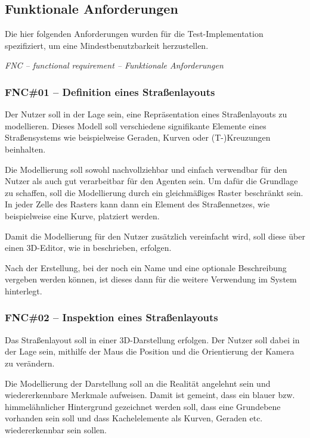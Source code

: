 \subsection{Funktionale Anforderungen}

Die hier folgenden Anforderungen wurden für die Test-Implementation spezifiziert, um eine Mindestbenutzbarkeit herzustellen.

\textit{FNC – functional requirement – Funktionale Anforderungen}

\subsubsection{FNC\#01 – Definition eines Straßenlayouts} \label{fnc:define_layout}

Der Nutzer soll in der Lage sein, eine Repräsentation eines Straßenlayouts zu modellieren.
Dieses Modell soll verschiedene signifikante Elemente eines Straßensystems wie beispielweise Geraden, Kurven oder (T-)Kreuzungen beinhalten.

Die Modellierung soll sowohl nachvollziehbar und einfach verwendbar für den Nutzer als auch gut verarbeitbar für den Agenten sein.
Um dafür die Grundlage zu schaffen, soll die Modellierung durch ein gleichmäßiges Raster beschränkt sein.
In jeder Zelle des Rasters kann dann ein Element des Straßennetzes, wie beispielweise eine Kurve, platziert werden.

Damit die Modellierung für den Nutzer zusätzlich vereinfacht wird, soll diese über einen 3D-Editor, wie in  beschrieben, erfolgen.

Nach der Erstellung, bei der noch ein Name und eine optionale Beschreibung vergeben werden können, ist dieses dann für die weitere Verwendung im System hinterlegt.

\subsubsection{FNC\#02 – Inspektion eines Straßenlayouts} \label{fnc:inspect_layout}

Das Straßenlayout soll in einer 3D-Darstellung erfolgen.
Der Nutzer soll dabei in der Lage sein, mithilfe der Maus die Position und die Orientierung der Kamera zu verändern.

Die Modellierung der Darstellung soll an die Realität angelehnt sein und wiedererkennbare Merkmale aufweisen.
Damit ist gemeint, dass ein blauer bzw. himmelähnlicher Hintergrund gezeichnet werden soll, dass eine Grundebene vorhanden sein soll und dass Kachelelemente als Kurven, Geraden etc. wiedererkennbar sein sollen.

